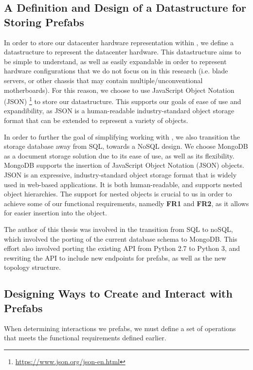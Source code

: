 \documentclass[11pt]{article}
\begin{document}
	\subsection{A Definition and Design of a Datastructure for Storing Prefabs}
		In order to store our datacenter hardware representation within \opendc{}, we define a datastructure to represent the datacenter hardware. 
		This datastructure aims to be simple to understand, as well as easily expandable in order to represent hardware configurations that we do not focus on in this research (i.e. blade servers, or other chassis that may contain multiple/unconventional motherboards). 
		For this reason, we choose to use JavaScript Object Notation (JSON) \footnote{\url{https://www.json.org/json-en.html}} to store our datastructure. 
		This supports our goals of ease of use and expandibility, as JSON is a human-readable industry-standard object storage format that can be extended to represent a variety of objects.

		In order to further the goal of simplifying working with \opendc{}, we also transition the storage database away from SQL, towards a NoSQL design.
		We choose MongoDB as a document storage solution due to its ease of use, as well as its flexibility.
		MongoDB supports the insertion of JavaScript Object Notation (JSON) objects.
		JSON is an expressive, industry-standard object storage format that is widely used in web-based applications.
		It is both human-readable, and supports nested object hierarchies.
		The support for nested objects is crucial to us in order to achieve some of our functional requirements, namedly \textbf{FR1} and \textbf{FR2}, as it allows for easier insertion into the object.

		The author of this thesis was involved in the transition from SQL to noSQL, which involved the porting of the current database schema to MongoDB. 
		This effort also involved porting the existing \opendc{} API from Python 2.7 to Python 3, and rewriting the API to include new endpoints for prefabs, as well as the new topology structure.


	\subsection{Designing Ways to Create and Interact with Prefabs}
		When determining interactions we prefabs, we must define a set of operations that meets the functional requirements defined earlier.
		

\newpage
\end{document}
